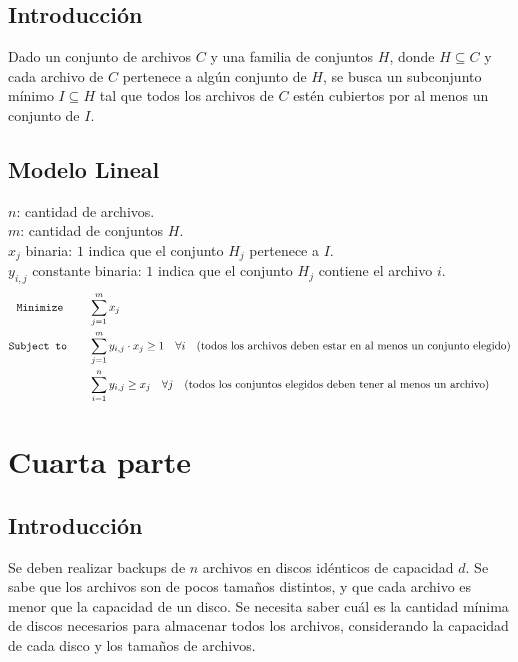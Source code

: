 \documentclass[11pt, a4paper, pdftex]{article}
\begin{document}
\subsection{Introducción}

Dado un conjunto de archivos \( C \) y una familia de conjuntos \( H \), donde \( H \subseteq C \) y cada archivo de \( C \) pertenece a algún conjunto de \( H \), se busca un subconjunto mínimo \( I \subseteq H \) tal que todos los archivos de \( C \) estén cubiertos por al menos un conjunto de \( I \).

\subsection{Modelo Lineal}

$n$: cantidad de archivos. \\

$m$: cantidad de conjuntos \( H \). \\

$x_{j}$ binaria: $1$ indica que el conjunto \( H_j \) pertenece a \( I \). \\ 

$y_{i,j}$ constante binaria: $1$ indica que el conjunto \( H_j \) contiene el archivo $i$. \\ 

\begin{alignat*}{2}
    \texttt{Minimize}\quad\,\, \quad & \sum_{j = 1}^{m} x_{j}\\
    \texttt{Subject to}\quad \quad & \sum_{j=1}^{m} y_{i,j} \cdot x_j \geq 1 \quad \forall i \quad \text{(todos los archivos deben estar en al menos un conjunto elegido)}\\
    & \sum_{i=1}^{n} y_{i,j} \geq x_j \quad \forall j \quad \text{(todos los conjuntos elegidos deben tener al menos un archivo)}\\
\end{alignat*}

\section{Cuarta parte}

\subsection{Introducción}

Se deben realizar backups de $n$ archivos en discos idénticos de
capacidad $d$.  Se sabe que los archivos son de pocos tamaños distintos,
y que cada archivo es menor que la capacidad de un disco. Se necesita
saber cuál es la cantidad mínima de discos necesarios para almacenar
todos los archivos, considerando la capacidad de cada disco y los
tamaños de archivos.
\end{document}
